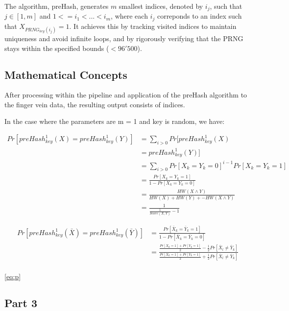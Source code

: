 The algorithm, preHash, generates \(m\) smallest indices, denoted by \(i_j\), such that \(j\in{[1, m]} \) and \(1 <= i_1 < ... < i_m\), where each \(i_j\) correponds to an index such that \(X_{PRNG_{key}(i_j)} = 1\). It achieves this by tracking visited indices to maintain uniqueness and avoid infinite loops, and by rigorously verifying that the PRNG stays within the specified bounds (\(< 96'500\)).   

\subsection{Mathematical Concepts}

After processing within the pipeline and application of the preHash algorithm to the finger vein data, the resulting output consists of indices. 

In the case where the parameters are m = 1 and key is random, we have: 

\begin{equation}
    \begin{aligned}
        Pr[preHash_{key}^1(X) = preHash_{key}^1(Y)] &= \sum_{i > 0} Pr[preHash_{key}^1(X)\\
        &= preHash_{key}^1(Y)]\\
        &= \sum_{i > 0} Pr[X_k = Y_k = 0]^{i - 1} Pr[X_k = Y_k = 1]\\
        &= \frac{Pr[X_k = Y_k = 1]}{1 - Pr[X_k = Y_k = 0]}\\
        &= \frac{HW(X \land Y)}{HW(X) + HW(Y) + - HW(X \land Y)}\\
        &= \frac{1}{\frac{1}{Score(X, Y)} - 1}
    \end{aligned}
\end{equation}

\begin{equation}
    \begin{aligned}
        Pr[preHash_{key}^1(\bar{X}) = preHash_{key}^1(\bar{Y})] &= \frac{Pr[\bar{X}_k = \bar{Y}_k = 1]}{1 - Pr[\bar{X}_k = \bar{Y}_k = 0]}\\
        &= \frac{\frac{Pr[X_k = 1] + Pr[Y_k = 1]}{2} - \frac{1}{2}Pr[\bar{X}_l \neq \bar{Y}_k]}{\frac{Pr[X_k = 1] + Pr[Y_k = 1]}{2} + \frac{1}{2}Pr[\bar{X}_l \neq \bar{Y}_k]}\\
    \end{aligned}
\end{equation}


\ref{eq:p}

\subsection{Part 3}